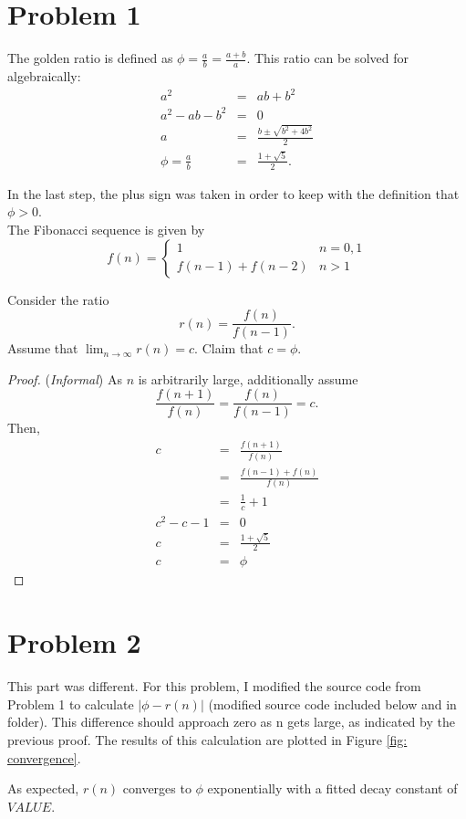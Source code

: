 \documentclass[aps,letterpaper,10pt]{article}
\begin{document}
\section{Problem 1}

The golden ratio is defined as $\phi = \frac{a}{b} = \frac{a + b}{a}$. This ratio can be solved for algebraically:
\begin{eqnarray*}
  a^2 & = & ab + b^2 \\
  a^2 - ab - b^2 & = & 0\\
  a & = & \frac{b \pm \sqrt{b^2 + 4b^2}}{2}\\
  \phi =  \frac{a}{b} & = & \frac{1 + \sqrt{5}}{2}.
\end{eqnarray*}

In the last step, the plus sign was taken in order to keep with the definition that $\phi>0$.\\

The Fibonacci sequence is given by 
\begin{displaymath}
  f(n) = \left\{
  \begin{array}{ll}
    1 &  n=0,1\\
    f(n-1) + f(n-2) & n>1
  \end{array}\right.
\end{displaymath}

Consider the ratio $$r(n) = \frac{f(n)}{f(n-1)}.$$ Assume that $\lim_{n\to\infty}r(n)=c$. Claim that $c=\phi$.\\

\begin{proof}
({\em Informal}) As $n$ is arbitrarily large, additionally assume $$\frac{f(n+1)}{f(n)} = \frac{f(n)}{f(n-1)} = c.$$ Then,
\begin{eqnarray*}
  c & = & \frac{f(n+1)}{f(n)}\\
    & = & \frac{f(n-1) + f(n)}{f(n)}\\
    & = & \frac{1}{c} + 1\\
  c^2 - c - 1 & = & 0\\
  c & = & \frac{1 + \sqrt{5}}{2}\\
  c & = & \phi
\end{eqnarray*}
\end{proof}

\newpage
\section{Problem 2}
This part was different.
For this problem, I modified the source code from Problem 1 to calculate $|\phi - r(n)|$ (modified source code included below and in folder). This difference should approach zero as n gets large, as indicated by the previous proof. The results of this calculation are plotted in Figure \ref{fig: convergence}. 



As expected, $r(n)$ converges to $\phi$ exponentially with a fitted decay constant of $VALUE$.



\newpage

\end{document}
